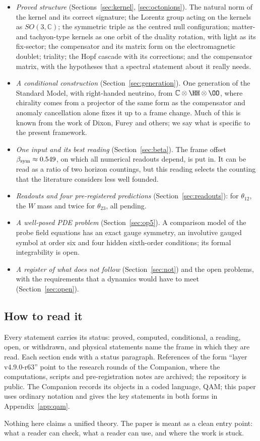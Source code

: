 \begin{itemize}
\item \emph{Proved structure} (Sections~\ref{sec:kernel}, \ref{sec:octonions}).  The natural norm of the kernel and its correct signature;
the Lorentz group acting on the kernels as \(SO(3,\mathbb C)\); the symmetric triple as the centred null configuration; matter- and
tachyon-type kernels as one orbit of the duality rotation, with light as its fix-sector; the compensator and its matrix form on the
electromagnetic doublet; triality; the Hopf cascade with its corrections; and the compensator matrix, with the hypotheses that a
spectral statement about it really needs.
\item \emph{A conditional construction} (Section~\ref{sec:generation}).  One generation of the Standard Model, with right-handed neutrino,
from \(\mathbb C\otimes\HH\otimes\OO\), where chirality comes from a projector of the same form as the compensator and anomaly
cancellation alone fixes it up to a frame change.  Much of this is known from the work of Dixon, Furey and others; we say what is
specific to the present framework.
\item \emph{One input and its best reading} (Section~\ref{sec:beta}).  The frame offset \(\beta_{\rm sym}\approx0.549\), on which all numerical
readouts depend, is put in.  It can be read as a ratio of two horizon countings, but this reading selects the counting that the
literature considers less well founded.
\item \emph{Readouts and four pre-registered predictions} (Section~\ref{sec:readouts}): for \(\theta_{12}\), the \(W\) mass and twice for
\(\theta_{23}\), all pending.
\item \emph{A well-posed PDE problem} (Section~\ref{sec:op5}).  A comparison model of the probe field equations has an exact gauge symmetry,
an involutive gauged symbol at order six and four hidden sixth-order conditions; its formal integrability is open.
\item \emph{A register of what does not follow} (Section~\ref{sec:not}) and the open problems, with the requirements that a dynamics would
have to meet (Section~\ref{sec:open}).
\end{itemize}

\subsection{How to read it}

Every statement carries its status: proved, computed, conditional, a reading, open, or withdrawn, and physical statements name the frame
in which they are read.  Each section ends with a status paragraph.  References of the form ``layer v4.9.0-r63'' point to the research
rounds of the Companion, where the computations, scripts and pre-registration notes are archived; the repository is public.  The
Companion records its objects in a coded language, QAM; this paper uses ordinary notation and gives the key statements in both forms in
Appendix~\ref{app:qam}.

Nothing here claims a unified theory.  The paper is meant as a clean entry point: what a reader can check, what a reader can use, and
where the work is stuck.

